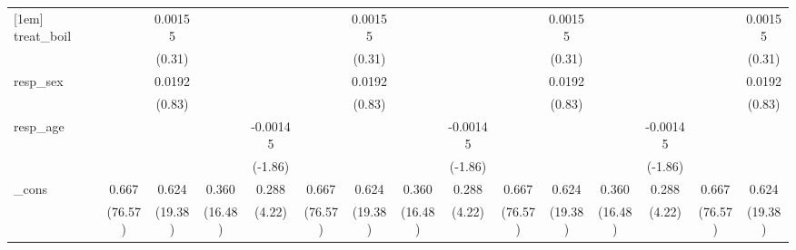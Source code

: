 {\begin{tabular}{l*{14}{c}}
[1em]
treat\_boil  &                     &     0.00155         &                     &                     &                     &     0.00155         &                     &                     &                     &     0.00155         &                     &                     &                     &     0.00155         \\
            &                     &      (0.31)         &                     &                     &                     &      (0.31)         &                     &                     &                     &      (0.31)         &                     &                     &                     &      (0.31)         \\
[1em]
resp\_sex    &                     &      0.0192         &                     &                     &                     &      0.0192         &                     &                     &                     &      0.0192         &                     &                     &                     &      0.0192         \\
            &                     &      (0.83)         &                     &                     &                     &      (0.83)         &                     &                     &                     &      (0.83)         &                     &                     &                     &      (0.83)         \\
[1em]
resp\_age    &                     &                     &                     &    -0.00145         &                     &                     &                     &    -0.00145         &                     &                     &                     &    -0.00145         &                     &                     \\
            &                     &                     &                     &     (-1.86)         &                     &                     &                     &     (-1.86)         &                     &                     &                     &     (-1.86)         &                     &                     \\
[1em]
\_cons      &       0.667\sym{***}&       0.624\sym{***}&       0.360\sym{***}&       0.288\sym{**} &       0.667\sym{***}&       0.624\sym{***}&       0.360\sym{***}&       0.288\sym{**} &       0.667\sym{***}&       0.624\sym{***}&       0.360\sym{***}&       0.288\sym{**} &       0.667\sym{***}&       0.624\sym{***}\\
            &     (76.57)         &     (19.38)         &     (16.48)         &      (4.22)         &     (76.57)         &     (19.38)         &     (16.48)         &      (4.22)         &     (76.57)         &     (19.38)         &     (16.48)         &      (4.22)         &     (76.57)         &     (19.38)         \\

\end{tabular}}
